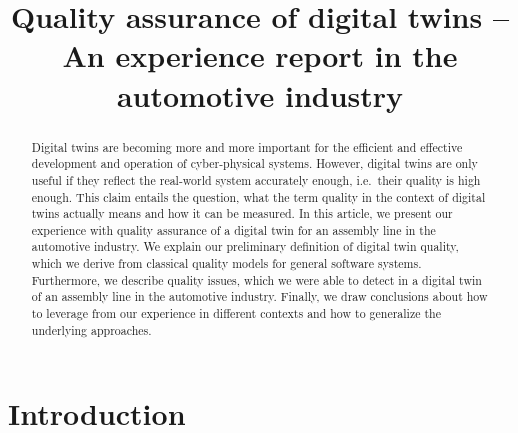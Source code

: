 \documentclass[9pt,conference]{IEEEtran}
\begin{document}
    \title{Quality assurance of digital twins -- An experience report in the automotive industry}
    \author{
        \and
    }
    \maketitle

    \begin{abstract}
        Digital twins are becoming more and more important for the efficient and effective development and operation of cyber-physical systems.
        However, digital twins are only useful if they reflect the real-world system accurately enough, i.e.\ their quality is high enough.
        This claim entails the question, what the term quality in the context of digital twins actually means and how it can be measured.
        In this article, we present our experience with quality assurance of a digital twin for an assembly line in the automotive industry.
        We explain our preliminary definition of digital twin quality, which we derive from classical quality models for general software systems.
        Furthermore, we describe quality issues, which we were able to detect in a digital twin of an assembly line in the automotive industry.
        Finally, we draw conclusions about how to leverage from our experience in different contexts and how to generalize the underlying approaches.
    \end{abstract}

    \section{Introduction}\label{section:introduction}
\end{document}
